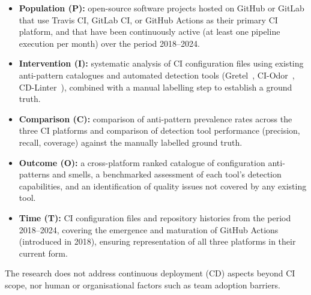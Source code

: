 \documentclass[12pt, a4paper]{article}
\begin{document}
\begin{itemize}
    \item \textbf{Population (P):} open-source software projects hosted on GitHub
          or GitLab that use Travis CI, GitLab CI, or GitHub Actions as their primary
          CI platform, and that have been continuously active (at least one pipeline
          execution per month) over the period 2018--2024.

    \item \textbf{Intervention (I):} systematic analysis of CI configuration files
          using existing anti-pattern catalogues and automated detection tools
          (Gretel~\cite{gallaba2020}, CI-Odor~\cite{vassallo2019}, CD-Linter~\cite{vassallo2020b}),
          combined with a manual labelling step to establish a ground truth.

    \item \textbf{Comparison (C):} comparison of anti-pattern prevalence rates across
          the three CI platforms and comparison of detection tool performance
          (precision, recall, coverage) against the manually labelled ground truth.

    \item \textbf{Outcome (O):} a cross-platform ranked catalogue of configuration
          anti-patterns and smells, a benchmarked assessment of each tool's detection
          capabilities, and an identification of quality issues not covered by any
          existing tool.

    \item \textbf{Time (T):} CI configuration files and repository histories from the
          period 2018--2024, covering the emergence and maturation of GitHub Actions
          (introduced in 2018), ensuring representation of all three platforms in
          their current form.
\end{itemize}

The research does not address continuous deployment (CD) aspects beyond CI scope,
nor human or organisational factors such as team adoption barriers.
\end{document}
